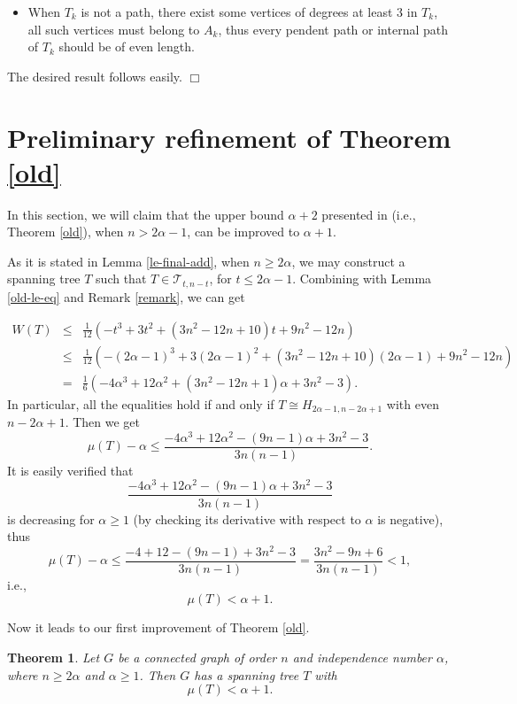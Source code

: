 \documentclass[12pt]{article}
\newtheorem{Theorem}{Theorem}[section]
\newenvironment {Proof} {\noindent {\bf Proof.}}{\hspace*{\fill}$\Box$\par\vspace{4mm}}
\begin{document}
\begin{Proof}
\begin{itemize}
\item

When $T_k$ is not a path, there exist some vertices of degrees at least $3$ in $T_k$, all such vertices must belong to $A_k$, thus every pendent path or internal path of $T_k$ should be of even length.


\end{itemize}

The desired result follows easily.
\end{Proof}


\section{Preliminary refinement of Theorem \ref{old}}

In this section, we will claim that the upper bound $\alpha + 2$ presented in \cite[Theorem 2.1]{Muk14} (i.e., Theorem \ref{old}), when $n > 2 \alpha - 1$, can be improved to $\alpha + 1$.



As it is stated in Lemma \ref{le-final-add}, when $n \ge 2 \alpha$, we may construct a spanning tree $T$ such that $T \in \mathcal{T}_{t, n-t}$, for $t \le 2 \alpha - 1$.
Combining with Lemma \ref{old-le-eq} and Remark \ref{remark}, we can get

\begin{eqnarray*}
W(T) &\le& \frac{1}{12}( -t^3 + 3t^2 + (3n^2 - 12n + 10)t + 9n^2 - 12n) \\
&\le& \frac{1}{12}( -(2 \alpha - 1)^3 + 3(2 \alpha - 1)^2 + (3n^2 - 12n + 10)(2 \alpha - 1) + 9n^2 - 12n) \\
&=& \frac{1}{6} (-4 \alpha^3 + 12 \alpha^2 + (3 n^2 -12 n + 1) \alpha +3 n^2 - 3).
\end{eqnarray*}
In particular, all the equalities hold
if and only if $T \cong H_{2 \alpha - 1, n - 2 \alpha + 1}$ with even $n - 2 \alpha + 1$.
Then we get
$$
\mu (T) - \alpha \le \frac{-4 \alpha^3 + 12\alpha^2 - (9n - 1)\alpha + 3n^2 - 3}{3 n (n-1)}.
$$
It is easily verified that
$$
\frac{-4 \alpha^3 + 12\alpha^2 - (9n - 1)\alpha  + 3n^2 - 3}{3 n (n-1)}
$$
is decreasing for $\alpha \ge 1$ (by checking its derivative with respect to $\alpha$ is negative), thus
$$
\mu (T) - \alpha \le \frac{-4 + 12 - (9n - 1) + 3n^2 - 3}{3 n (n-1)} = \frac{3n^2 - 9 n + 6}{3 n (n-1)} < 1,
$$
i.e.,
$$
\mu (T) < \alpha + 1.
$$

Now it leads to our first improvement of Theorem \ref{old}.

\begin{Theorem} \label{th-new}
Let $G$ be a connected graph of order $n$ and independence number $\alpha$, where $n \ge 2 \alpha$ and $\alpha \ge 1$. Then $G$ has a spanning tree $T$ with
$$
\mu(T) < \alpha + 1.
$$
\end{Theorem}
\end{document}
